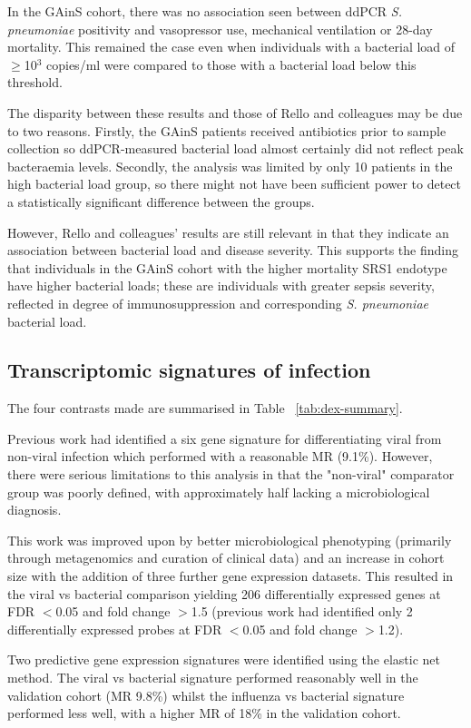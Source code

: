 In the GAinS cohort, there was no association seen between ddPCR \textit{S. pneumoniae} positivity and vasopressor use, mechanical ventilation or 28-day mortality. This remained the case even when individuals with a bacterial load of $\geq$10$^3$ copies/ml were compared to those with a bacterial load below this threshold. 

The disparity between these results and those of Rello and colleagues may be due to two reasons. Firstly, the GAinS patients received antibiotics prior to sample collection so ddPCR-measured bacterial load almost certainly did not reflect peak bacteraemia levels. Secondly, the analysis was limited by only 10 patients in the high bacterial load group, so there might not have been sufficient power to detect a statistically significant difference between the groups. 

However, Rello and colleagues' results are still relevant in that they indicate an association between bacterial load and disease severity. This supports the finding that individuals in the GAinS cohort with the higher mortality SRS1 endotype have higher bacterial loads; these are individuals with greater sepsis severity, reflected in degree of immunosuppression and corresponding \textit{S. pneumoniae} bacterial load.

\subsection{Transcriptomic signatures of infection}
The four contrasts made are summarised in Table ~\ref{tab:dex-summary}.

Previous work had identified a six gene signature for differentiating viral from non-viral infection which performed with a reasonable MR (9.1\%). However, there were serious limitations to this analysis in that the "non-viral" comparator group was poorly defined, with approximately half lacking a microbiological diagnosis.

This work was improved upon by better microbiological phenotyping (primarily through metagenomics and curation of clinical data) and an increase in cohort size with the addition of three further gene expression datasets. This resulted in the viral vs bacterial comparison yielding 206 differentially expressed genes at FDR $<$0.05 and fold change $>$1.5 (previous work had identified only 2 differentially expressed probes at FDR $<$0.05 and fold change $>$1.2). 

Two predictive gene expression signatures were identified using the elastic net method. The viral vs bacterial signature performed reasonably well in the validation cohort (MR 9.8\%) whilst the influenza vs bacterial signature performed less well, with a higher MR of 18\% in the validation cohort. 

